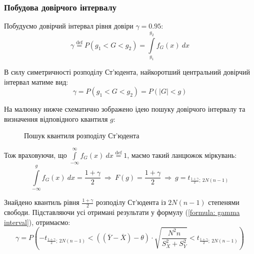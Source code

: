 \subsubsection*{Побудова довірчого інтервалу}

Побудуємо довірчий інтервал рівня довіри $\gamma=0.95:$
\[ \gamma \overset{\mathrm{def}}{=} P(g_1<G<g_2)=\int\limits_{g_1}^{g_2}f_G(x)\ dx  \] 

В силу симетричності розподілу Ст'юдента, найкоротший центральний довірчий інтервал матиме вид:
\begin{equation}
    \gamma = P(g_1<G<g_2)=P(|G|<g) \label{formula: gamma interval}
\end{equation}

На малюнку нижче схематично зображено ідею пошуку довірчого інтервалу та визначення відповідного 
квантиля $g:$ 

\begin{figure}[H]
    \caption{Пошук квантиля розподілу Ст'юдента}
    \label{fig:interval}
\end{figure}

Тож враховуючи, що 
$\int\limits_{-\infty}^{\infty}f_G(x)\ dx \overset{\mathrm{def}}{=} 1$, маємо такий ланцюжок міркувань:
\[ \int\limits_{-\infty}^{g}f_G(x)\ dx=\frac{1+\gamma}{2} \
\Rightarrow\ F(g)= \frac{1+\gamma}{2} \
\Rightarrow\ g = t_{\frac{1+\gamma}{2};\ 2N(n-1)} \]

Знайдено квантиль рівня $\frac{1+\gamma}{2}$ розподілу Ст'юдента із $2N(n-1)$ степенями свободи. Підставляючи 
усі отримані результати у формулу (\ref{formula: gamma interval}), отримаємо:
\begin{equation}
    \gamma = P\left(-t_{\tfrac{1+\gamma}{2};\ 2N(n-1)} < \left((\overline{Y}-\overline{X})-\theta\right)\cdot 
    \sqrt{\frac{N^2n}{S_X^2+S_Y^2}} < t_{\tfrac{1+\gamma}{2};\ 2N(n-1)}\right) \label{formula: UKR trusted interval}
\end{equation}

